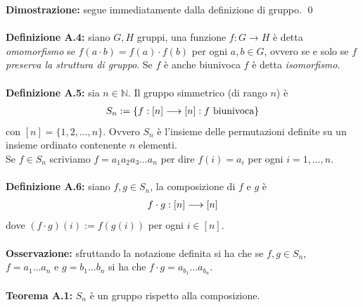 \documentclass{article}
\begin{document}
\textbf{Dimostrazione:} segue immediatamente dalla definizione di gruppo. \qed \\ \\
\textbf{Definizione A.4:} siano $G, H$ gruppi, una funzione $f : G \longrightarrow H$ è detta \textit{omomorfismo} se $f(a \cdot b) = f(a) \cdot f(b)$ per ogni $a, b \in G$, ovvero se e solo se $f$ \textit{preserva la struttura di gruppo}. Se $f$ è anche biunivoca $f$ è detta \textit{isomorfismo}. \\ \\
\textbf{Definizione A.5:} sia $n \in \mathbb{N}$. Il gruppo simmetrico (di rango $n$) è
\begin{gather}
    S_n := \{ f : [n] \longrightarrow [n] : f \text{ biunivoca} \} \notag
\end{gather}
con $[n] = \{1, 2, \dots, n \}$. Ovvero $S_n$ è l'insieme delle permutazioni definite su un insieme ordinato contenente $n$ elementi. \\
Se $f \in S_n$ scriviamo $f = a_1a_2a_3 \dots a_n$ per dire $f(i) = a_i$ per ogni $i = 1, \dots, n$. \\ \\
\textbf{Definizione A.6:} siano $f, g \in S_n$, la composizione di $f$ e $g$ è
\begin{gather}
    f \cdot g : [n] \longrightarrow [n] \notag
\end{gather}
dove $(f \cdot g) (i) := f(g(i))$ per ogni $i \in [n]$. \\ \\
\textbf{Osservazione:} sfruttando la notazione definita si ha che se $f, g \in S_n$, \\ $f = a_1 \dots a_n$ e $g = b_1 \dots b_n$ si ha che $f \cdot g = a_{b_1} \dots a_{b_n}$. \\ \\
\textbf{Teorema A.1:} $S_n$ è un gruppo rispetto alla composizione. \\
\end{document}
